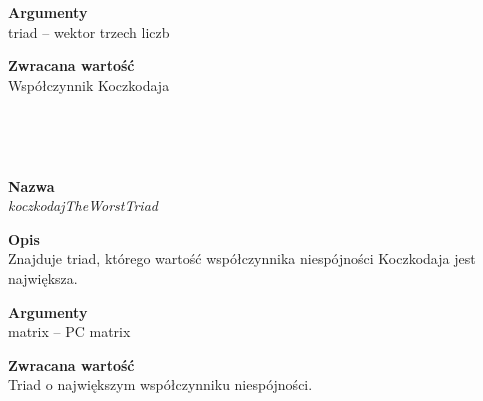 \begin{spacing}{1.1}
\begin{spacing}{1.2}
\textbf{Argumenty} \\
triad -- wektor trzech liczb \\ \begin{spacing}{0.3}  \end{spacing}

\textbf{Zwracana wartość}\\ Współczynnik Koczkodaja \\ \begin{spacing}{0.3}  \end{spacing}\\


\newpage
\begin{spacing}{1.2}
 \\ \begin{spacing}{0.5}  \end{spacing}

\textbf{Nazwa}\\  \emph{koczkodajTheWorstTriad} \\ \begin{spacing}{0.3}  \end{spacing}
 
\textbf{Opis}\\ Znajduje triad, którego wartość współczynnika niespójności Koczkodaja jest największa.\\  \begin{spacing}{0.3}  \end{spacing}
 
\textbf{Argumenty} \\
matrix -- PC matrix \\ \begin{spacing}{0.3}  \end{spacing}

\textbf{Zwracana wartość}\\ Triad o największym współczynniku niespójności. \\ \begin{spacing}{0.3}  \end{spacing}\\


\\~\\
\begin{spacing}{1.2}
 \\ \begin{spacing}{0.5}  \end{spacing}


\end{spacing}
\end{spacing}
\end{spacing}
\end{spacing}
